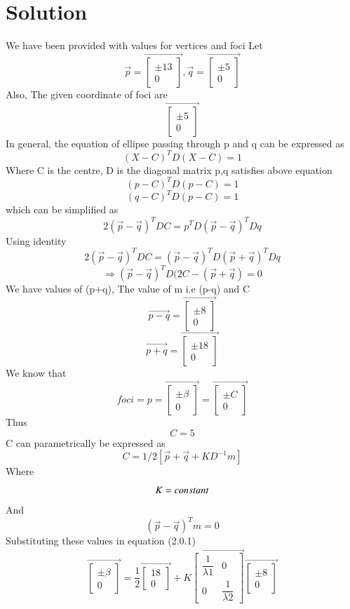 \documentclass[journal,12pt,twocolumn]{IEEEtran}
\begin{document}
\section{Solution}
We have been provided with values for vertices and foci
\newline
Let
$$\vec {p}=\vec{\begin{bmatrix}\pm 13 \\ 0 \end{bmatrix}},
\vec {q}=\vec{\begin{bmatrix}\pm 5 \\ 0 \end{bmatrix}}$$
Also, The given coordinate of foci are $$\vec{\begin{bmatrix}\pm 5 \\ 0 \end{bmatrix}}$$
In general, the equation of ellipse passing through p and q can be expressed as 
$$(X-C)^TD (X-C)=1$$
Where
\newline
C is the centre, D is the diagonal matrix 
p,q satisfies above equation
$$(p-C)^T D (p-C)=1$$
$$(q-C)^T D (p-C)=1$$
which can be simplified as 
$$2(\vec{p}-\vec{q})^T DC= p^T D(\vec{p}-\vec{q})^T Dq$$
Using identity
$$2(\vec{p}-\vec{q})^T DC= (\vec{p}-\vec{q})^TD(\vec{p}+\vec{q})^TDq$$
$$\Rightarrow (\vec{p}-\vec{q})^T D (2C-(\vec{p}+\vec{q}) = 0$$
We have values of (p+q), The value of m i.e (p-q) and C
$$\vec {p-q}=\vec{\begin{bmatrix}\pm 8 \\ 0 \end{bmatrix}}$$
$$\vec {p+q}=\vec{\begin{bmatrix}\pm 18 \\ 0 \end{bmatrix}}$$
We know that $$foci= p=\vec{\begin{bmatrix}\pm \beta \\ 0 \end{bmatrix}}=\vec{\begin{bmatrix}\pm C \\ 0 \end{bmatrix}}$$
Thus $$C=5$$
C can parametrically be expressed as
\begin{equation}
C=1/2 [\vec{p}+\vec{q}+KD^{-1}m]
\end{equation}
Where
$$\newline K= constant$$
And $$(\vec{p}-\vec{q})^Tm=0$$
Substituting these values in equation (2.0.1)
$$\vec{\begin{bmatrix}\pm \beta \\ 0 \end{bmatrix}}=\dfrac{1}{2}\vec{\begin{bmatrix} 18 \\ 0 \end{bmatrix}}+K \vec{\begin{bmatrix}
\dfrac{1}{\lambda1} & 0 \\
0 & \dfrac{1}{\lambda2}
\end{bmatrix}}\vec{\begin{bmatrix}\pm 8 \\ 0 \end{bmatrix}}$$
\end{document}

